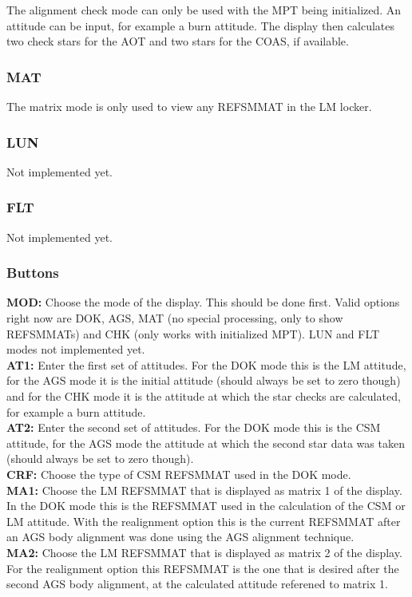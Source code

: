 \documentclass[11pt]{article} %
\begin{document}
The alignment check mode can only be used with the MPT being initialized. An attitude can be input, for example a burn attitude. The display then calculates two check stars for the AOT and two stars for the COAS, if available.\\

\subsubsection{MAT}

The matrix mode is only used to view any REFSMMAT in the LM locker.\\

\subsubsection{LUN}

Not implemented yet.\\

\subsubsection{FLT}

Not implemented yet.\\

\subsubsection{Buttons}

\textbf{MOD:} Choose the mode of the display. This should be done first. Valid options right now are DOK, AGS, MAT (no special processing, only to show REFSMMATs) and CHK (only works with initialized MPT). LUN and FLT modes not implemented yet.\\
\textbf{AT1:} Enter the first set of attitudes. For the DOK mode this is the LM attitude, for the AGS mode it is the initial attitude (should always be set to zero though) and for the CHK mode it is the attitude at which the star checks are calculated, for example a burn attitude.\\
\textbf{AT2:} Enter the second set of attitudes. For the DOK mode this is the CSM attitude, for the AGS mode the attitude at which the second star data was taken (should always be set to zero though).\\
\textbf{CRF:} Choose the type of CSM REFSMMAT used in the DOK mode.\\
\textbf{MA1:} Choose the LM REFSMMAT that is displayed as matrix 1 of the display. In the DOK mode this is the REFSMMAT used in the calculation of the CSM or LM attitude. With the realignment option this is the current REFSMMAT after an AGS body alignment was done using the AGS alignment technique.\\ 
\textbf{MA2:} Choose the LM REFSMMAT that is displayed as matrix 2 of the display. For the realignment option this REFSMMAT is the one that is desired after the second AGS body alignment, at the calculated attitude referened to matrix 1.\\
\end{document}

